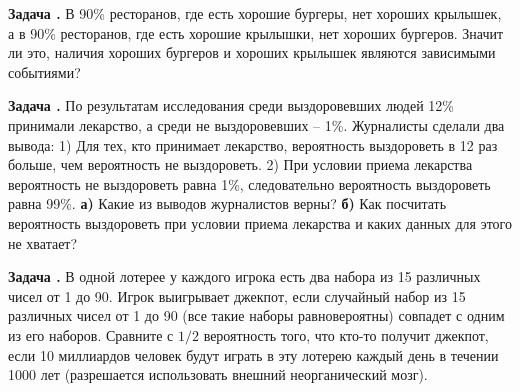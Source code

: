 \documentclass[11pt,a4paper]{article}
\newcounter{znum}
\newcommand{\z}[1]{\addtocounter{znum}{1} \textbf{Задача \arabic{znum}#1. }}
\renewcommand{\!}{\textcolor{red}{!}}
\begin{document}
\z{} В 90\% ресторанов, где есть хорошие бургеры, нет хороших крылышек, а в 90\% ресторанов, где есть хорошие крылышки, нет хороших бургеров. Значит ли это, наличия хороших бургеров и хороших крылышек являются зависимыми событиями?

\z{} По результатам исследования среди выздоровевших людей 12\% принимали лекарство, а среди не выздоровевших -- 1\%. Журналисты сделали два вывода: 1) Для тех, кто принимает лекарство, вероятность выздороветь в 12 раз больше, чем вероятность не выздороветь. 2) При условии приема лекарства вероятность не выздороветь равна 1\%, следовательно вероятность выздороветь равна 99\%. \textbf{а)} Какие из выводов журналистов верны?
\textbf{б)} Как посчитать вероятность выздороветь при условии приема лекарства и каких данных для этого не хватает?

\z{} В одной лотерее у каждого игрока есть два набора из 15 различных чисел от 1 до 90. Игрок выигрывает джекпот, если случайный набор из 15 различных чисел от 1 до 90 (все такие наборы равновероятны) совпадет с одним из его наборов. Сравните с $1/2$ вероятность того, что кто-то получит джекпот, если 10 миллиардов человек будут играть в эту лотерею каждый день в течении 1000 лет (разрешается использовать внешний неорганический мозг).
\end{document}
